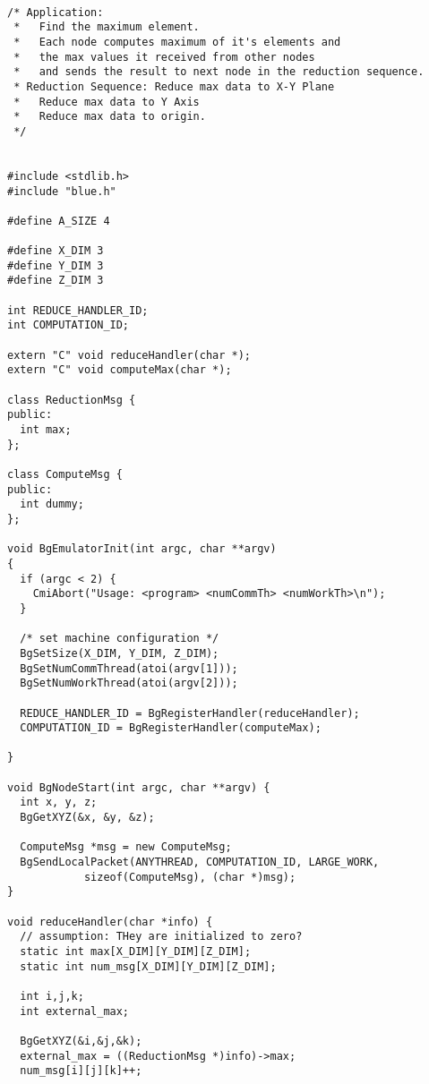\documentclass[10pt]{article}
\begin{document}
\begin{verbatim}

/* Application: 
 *   Find the maximum element.
 *   Each node computes maximum of it's elements and
 *   the max values it received from other nodes
 *   and sends the result to next node in the reduction sequence.
 * Reduction Sequence: Reduce max data to X-Y Plane
 *   Reduce max data to Y Axis
 *   Reduce max data to origin.
 */


#include <stdlib.h>
#include "blue.h"

#define A_SIZE 4

#define X_DIM 3
#define Y_DIM 3
#define Z_DIM 3

int REDUCE_HANDLER_ID;
int COMPUTATION_ID;

extern "C" void reduceHandler(char *);
extern "C" void computeMax(char *);

class ReductionMsg {
public:
  int max;
};

class ComputeMsg {
public:
  int dummy;
};

void BgEmulatorInit(int argc, char **argv)
{
  if (argc < 2) { 
    CmiAbort("Usage: <program> <numCommTh> <numWorkTh>\n"); 
  }

  /* set machine configuration */
  BgSetSize(X_DIM, Y_DIM, Z_DIM);
  BgSetNumCommThread(atoi(argv[1]));
  BgSetNumWorkThread(atoi(argv[2]));

  REDUCE_HANDLER_ID = BgRegisterHandler(reduceHandler);
  COMPUTATION_ID = BgRegisterHandler(computeMax);

}

void BgNodeStart(int argc, char **argv) {
  int x, y, z;
  BgGetXYZ(&x, &y, &z);

  ComputeMsg *msg = new ComputeMsg;
  BgSendLocalPacket(ANYTHREAD, COMPUTATION_ID, LARGE_WORK, 
			sizeof(ComputeMsg), (char *)msg);
}

void reduceHandler(char *info) {
  // assumption: THey are initialized to zero?
  static int max[X_DIM][Y_DIM][Z_DIM];
  static int num_msg[X_DIM][Y_DIM][Z_DIM];

  int i,j,k;
  int external_max;

  BgGetXYZ(&i,&j,&k);
  external_max = ((ReductionMsg *)info)->max;
  num_msg[i][j][k]++;


\end{verbatim}
\end{document}
